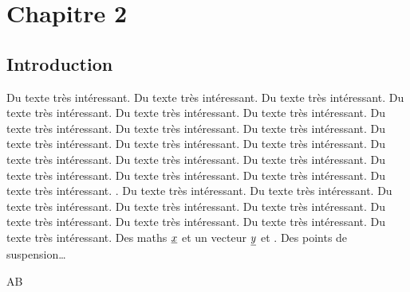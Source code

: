 
\lhead[\fancyplain{}{\leftmark}]%
      {\fancyplain{}{}} %
\chead[\fancyplain{}{}]%
      {\fancyplain{}{}}
\rhead[\fancyplain{}{}]%
      {\fancyplain{}{\rightmark}}%
\lfoot[\fancyplain{}{}]%
      {\fancyplain{}{}}
\cfoot[\fancyplain{}{\thepage}]%
      {\fancyplain{}{\thepage}} %
\rfoot[\fancyplain{}{}]%
     {\fancyplain{}{\scriptsize}}


\chapter{Chapitre 2}
\label{ch:2}

\minitoc
\newpage



\section{Introduction}
\label{sec:intro2}

Du texte très intéressant. Du texte très intéressant. Du texte très intéressant. Du texte très intéressant. Du texte très intéressant. Du texte très intéressant. Du texte très intéressant. Du texte très intéressant. Du texte très intéressant. Du texte très intéressant. Du texte très intéressant. Du texte très intéressant. Du texte très intéressant. Du texte très intéressant. Du texte très intéressant. Du texte très intéressant. Du texte très intéressant. Du texte très intéressant. Du texte très intéressant. . Du texte très intéressant. Du texte très intéressant. Du texte très intéressant. Du texte très intéressant. Du texte très intéressant. Du texte très intéressant. Du texte très intéressant. Du texte très intéressant. Du texte très intéressant. Des maths $\underline{x}$ et un vecteur $\underline{y} $ et . Des \og points de suspension\fg \ldots

\underbold AB

